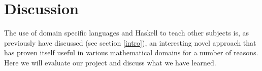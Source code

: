\section{Discussion}






The use of domain specific languages and Haskell to teach other subjects is, as previously have discussed (see section \ref{intro}), an interesting novel approach that has proven itself useful in various mathematical domains for a number of reasons. Here we will evaluate our project and discuss what we have learned. 




